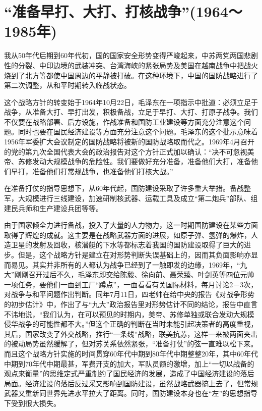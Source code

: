 \documentclass[UTF8, 12pt, a4paper]{ctexrep}
\begin{document}
\section{“准备早打、大打、打核战争”(1964～1985年)}

我从50年代后期到60年代初，国的国家安全形势变得严峻起来，中苏两党两国悲剧性的分裂、中印边境的武装冲突、台湾海峡的紧张局势及美国在越南战争中把战火烧到了北方等都使中国周边的平静被打破。在这种环境下，中国的国防战略进行了第二次调整，从和平时期转入临战状态。

这个战略方针的转变始于1964年10月22日，毛泽东在一项指示中批道：必须立足于战争，从准备大打、早打出发，积极备战，立足于早打、大打、打原子战争。我们不仅要在战略部署、后方设施，作战准备和国防工业建设等方面充分注意这个问题。同时也要在国民经济建设等方面充分注意这个问题。毛泽东的这个批示意味着1956年军委扩大会议制定的国防战略将被新的国防战略取而代之。1969年4月召开的党的第九次全国代表大会的政治报告对这个方针正式加以确认：“决不可忽视美帝、苏修发动大规模战争的危险性。我们要做好充分准备，准备他们大打，准备他们早打，准备他们打常规战争，也准备他们打核大战。”

在准备打仗的指导思想下，从60年代起，国防建设采取了许多重大举措。备战整军，大规模进行三线建设，加速研制核武器、运载工具及成立“第二炮兵”部队、组建民兵师和生产建设兵团等等。

由于国家倾全力进行备战，投入了大量的人力物力，这一时期国防建设在某些方面取得了辉煌的成就。这主要是在战略武器方面的进展，如原子弹、氢弹的爆炸，人造卫星的发射及回收，核潜艇的下水等都标志着我国的国防建设取得了巨大的进步。但是，这个战略方针是建立在对形势判断失误基础上的，因而其负面影响亦显而易见。其实并非所有的人都认为战争已经到了一触即发的边缘，1969年，“九大”刚刚召开过后不久，毛泽东即交给陈毅、徐向前、聂荣臻、叶剑英等四位元帅一项任务，要他们一面到工厂“蹲点”，一面看看有关国际材料，每月讨论2－3次，对战争与和平问题作出判断。同年7月11日，四老帅在给中央的报告《对战争形势的初步估计》中，作出了与“九大”政治报告里对形势估计不同的结论，报告中直言不讳地说，“我们认为，在可以预见的时期内，美帝、苏修单独或联合发动大规模侵华战争的可能性都不大。”但这个正确的判断在当时未能引起决策者的高度重视，其后，国家改变了外交战略，推行“一条线”战略，联美抗苏，这样一来被两面夹击的被动局势虽然缓解了，但对苏关系依然紧张，“准备打仗”的弦一直难以松下来。而且这个战略方针实施的时间贯穿60年代中期到80年代中期整整20年，其中60年代中期到70年代中期最甚，军费开支的加大，军队员额的激增，加上“一切以战备的观点来衡量”的思维定式严重制约了国民经济的发展，造成了中国经济建设的落后局面。经济建设的落后反过采又影响到国防建设，虽然战略武器搞上去了，但常规武器又重新同世界先进水平拉大了距离。同时，国防建设本身也在“左”的思想指导下受到很大损失。
\end{document}
